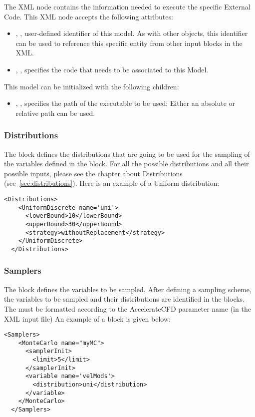 The  XML node contains the information needed to execute the specific External Code. This
XML node accepts the following attributes:
\begin{itemize}
  \item {}, , user-defined identifier of this model.
    \nb As with other objects, this identifier can be used to reference this specific entity from other input
    blocks in the XML.
  \item {}, , specifies the code that needs to be
    associated to this Model.
\end{itemize}
This model can be initialized with the following children:
\begin{itemize}
  \item {}, , specifies the path of the executable to
    be used; \nb Either an absolute or relative path can be used.
\end{itemize}


\subsubsection{Distributions}
The  block defines the distributions that are going to be used for the sampling
of the variables defined in the  block. For all the possible distributions and all
their possible inputs, please see the chapter about Distributions (see~\ref{sec:distributions}). Here is an example of a
Uniform distribution:
\begin{lstlisting}[style=XML]
  <Distributions>
    <UniformDiscrete name='uni'>
      <lowerBound>10</lowerBound>
      <upperBound>30</upperBound>
      <strategy>withoutReplacement</strategy>
    </UniformDiscrete>
  </Distributions>
\end{lstlisting}
%
\subsubsection{Samplers}
The  block defines the variables to be sampled. After defining a sampling scheme, the variables to be sampled and
their distributions are identified in the  blocks.
The  must be formatted according to the AccelerateCFD parameter name (in the XML input file)
An example of a  block is given below:
\begin{lstlisting}[style=XML]
 <Samplers>
    <MonteCarlo name="myMC">
      <samplerInit>
        <limit>5</limit>
      </samplerInit>
      <variable name='velMods'>
        <distribution>uni</distribution>
      </variable>
    </MonteCarlo>
  </Samplers>
\end{lstlisting}

